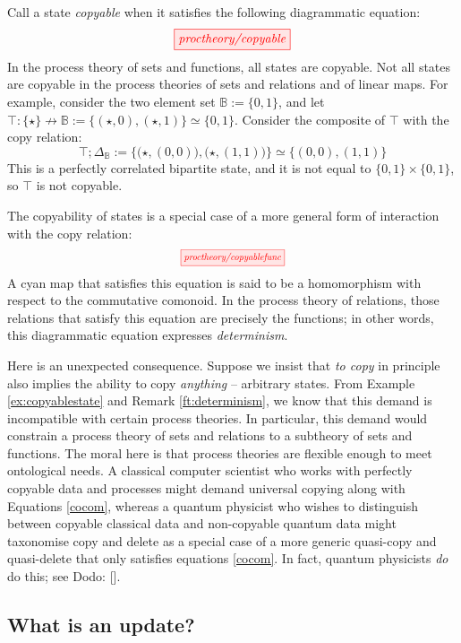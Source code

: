 \begin{example}\label{ex:copyablestate}
Call a state \emph{copyable} when it satisfies the following diagrammatic equation:
\[\tikzfig{proctheory/copyable}\]
In the process theory of sets and functions, all states are copyable. Not all states are copyable in the process theories of sets and relations and of linear maps. For example, consider the two element set $\mathbb{B} := \{0,1\}$, and let $\top : \{\star\} \nrightarrow \mathbb{B} := \{(\star,0),(\star,1)\} \simeq \{0,1\}$. Consider the composite of $\top$ with the copy relation:
\[\top;\Delta_{\mathbb{B}} := \{\big(\star,(0,0)\big),\big(\star,(1,1)\big)\} \simeq \{(0,0),(1,1)\}\]
This is a perfectly correlated bipartite state, and it is not equal to $\{0,1\} \times \{0,1\}$, so $\top$ is not copyable.
\end{example}


\begin{remark}\label{ft:determinism}
The copyability of states is a special case of a more general form of interaction with the copy relation:
\[\scalebox{0.75}{\tikzfig{proctheory/copyablefunc}}\]
A cyan map that satisfies this equation is said to be a homomorphism with respect to the commutative comonoid. In the process theory of relations, those relations that satisfy this equation are precisely the functions; in other words, this diagrammatic equation expresses \emph{determinism}.
\end{remark}

Here is an unexpected consequence. Suppose we insist that \emph{to copy} in principle also implies the ability to copy \emph{anything} -- arbitrary states. From Example \ref{ex:copyablestate} and Remark \ref{ft:determinism}, we know that this demand is incompatible with certain process theories. In particular, this demand would constrain a process theory of sets and relations to a subtheory of sets and functions. The moral here is that process theories are flexible enough to meet ontological needs. A classical computer scientist who works with perfectly copyable data and processes might demand universal copying along with Equations \ref{cocom}, whereas a quantum physicist who wishes to distinguish between copyable classical data and non-copyable quantum data might taxonomise copy and delete as a special case of a more generic quasi-copy and quasi-delete that only satisfies equations \ref{cocom}. In fact, quantum physicists \emph{do} do this; see Dodo: [].

\subsection{What is an update?}\label{ss:update}

